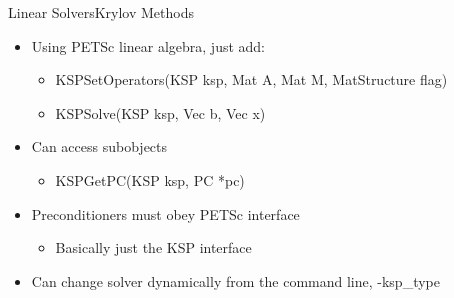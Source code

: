 \begin{frame}{Linear Solvers}{Krylov Methods}

\begin{itemize}
  \item Using PETSc linear algebra, just add:
  \begin{itemize}
    \item {\kb KSPSetOperators(KSP ksp, Mat A, Mat M, MatStructure flag)}
    \item {\kb KSPSolve(KSP ksp, Vec b, Vec x)}
  \end{itemize}

  \item Can access subobjects
  \begin{itemize}
    \item {\kb KSPGetPC(KSP ksp, PC *pc)}
  \end{itemize}

  \item Preconditioners must obey PETSc interface
  \begin{itemize}
    \item Basically just the KSP interface
  \end{itemize}

  \item Can change solver dynamically from the command line, {\kb -ksp\_type}
\end{itemize}

\end{frame}
